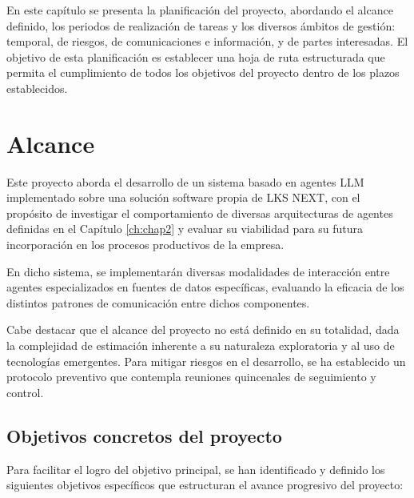 

En este capítulo se presenta la planificación del proyecto, abordando el alcance definido, los periodos de realización de tareas y los diversos ámbitos de gestión: temporal, de riesgos, de comunicaciones e información, y de partes interesadas. El objetivo de esta planificación es establecer una hoja de ruta estructurada que permita el cumplimiento de todos los objetivos del proyecto dentro de los plazos establecidos.

\section{Alcance}

Este proyecto aborda el desarrollo de un sistema basado en agentes LLM implementado sobre una solución software propia de LKS NEXT, con el propósito de investigar el comportamiento de diversas arquitecturas de agentes definidas en el Capítulo \ref{ch:chap2} y evaluar su viabilidad para su futura incorporación en los procesos productivos de la empresa.

En dicho sistema, se implementarán diversas modalidades de interacción entre agentes especializados en fuentes de datos específicas, evaluando la eficacia de los distintos patrones de comunicación entre dichos componentes.

Cabe destacar que el alcance del proyecto no está definido en su totalidad, dada la complejidad de estimación inherente a su naturaleza exploratoria y al uso de tecnologías emergentes. Para mitigar riesgos en el desarrollo, se ha establecido un protocolo preventivo que contempla reuniones quincenales de seguimiento y control.

\subsection{Objetivos concretos del proyecto}
\label{chap3:objetivos}

Para facilitar el logro del objetivo principal, se han identificado y definido los siguientes objetivos específicos que estructuran el avance progresivo del proyecto:

